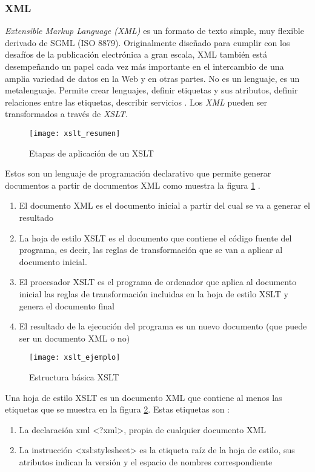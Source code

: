 \subsubsection{XML}
\label{MarcoConceptual:XML}
\emph{Extensible Markup Language (XML)} es un formato de texto simple, muy flexible derivado de SGML (ISO 8879). Originalmente diseñado para cumplir con los desafíos de la publicación electrónica a gran escala, XML también está desempeñando un papel cada vez más importante en el intercambio de una amplia variedad de datos en la Web y en otras partes. No es un lenguaje, es un metalenguaje. Permite crear lenguajes, definir etiquetas y sus atributos, definir relaciones entre las etiquetas, describir servicios \cite{XSLT:definiciones,XML:W3C}.
Los \emph{XML} pueden ser transformados a través de \emph{XSLT}.
  \begin{figure}[h]
    \centering
    \texttt{[image: xslt\_resumen]}
    \caption{Etapas de aplicación de un XSLT}
    \label{figura:xslt_resumen}
  \end{figure}
 Estos son un lenguaje de programación declarativo que permite generar documentos a partir de documentos XML como muestra la figura \ref{figura:xslt_resumen} \cite{XSLT:definiciones}.
 \begin{enumerate}
				\item El documento XML es el documento inicial a partir del cual se va a generar el resultado
				\item La hoja de estilo XSLT es el documento que contiene el código fuente del programa, es decir, las reglas de transformación que se van a aplicar al documento inicial.
				\item El procesador XSLT es el programa de ordenador que aplica al documento inicial las reglas de transformación incluidas en la hoja de estilo XSLT y genera el documento final
				\item El resultado de la ejecución del programa es un nuevo documento (que puede ser un documento XML o no)
				\end{enumerate}
  \begin{figure}[h]
    \centering
    \texttt{[image: xslt\_ejemplo]}
    \caption{Estructura básica XSLT}
    \label{figura:xslt_ejemplo}
  \end{figure}	
Una hoja de estilo XSLT es un documento XML que contiene al menos las etiquetas que se muestra en la figura \ref{figura:xslt_ejemplo}. Estas etiquetas son \cite{XSLT:definiciones}:
 				\begin{enumerate}
				\item La declaración xml <?xml>, propia de cualquier documento XML
				\item La instrucción <xsl:stylesheet> es la etiqueta raíz de la hoja de estilo, sus atributos indican la versión y el espacio de nombres correspondiente
				\end{enumerate}
